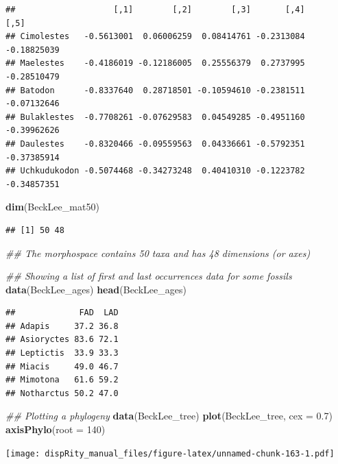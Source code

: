 \documentclass[]{book}
\newenvironment{Shaded}{\begin{snugshade}}{\end{snugshade}}
\newcommand{\CommentTok}[1]{\textcolor[rgb]{0.56,0.35,0.01}{\textit{#1}}}
\newcommand{\DataTypeTok}[1]{\textcolor[rgb]{0.13,0.29,0.53}{#1}}
\newcommand{\DecValTok}[1]{\textcolor[rgb]{0.00,0.00,0.81}{#1}}
\newcommand{\FloatTok}[1]{\textcolor[rgb]{0.00,0.00,0.81}{#1}}
\newcommand{\KeywordTok}[1]{\textcolor[rgb]{0.13,0.29,0.53}{\textbf{#1}}}
\newcommand{\NormalTok}[1]{#1}
\begin{document}
\begin{verbatim}
##                    [,1]        [,2]        [,3]       [,4]        [,5]
## Cimolestes   -0.5613001  0.06006259  0.08414761 -0.2313084 -0.18825039
## Maelestes    -0.4186019 -0.12186005  0.25556379  0.2737995 -0.28510479
## Batodon      -0.8337640  0.28718501 -0.10594610 -0.2381511 -0.07132646
## Bulaklestes  -0.7708261 -0.07629583  0.04549285 -0.4951160 -0.39962626
## Daulestes    -0.8320466 -0.09559563  0.04336661 -0.5792351 -0.37385914
## Uchkudukodon -0.5074468 -0.34273248  0.40410310 -0.1223782 -0.34857351
\end{verbatim}

\begin{Shaded}
\begin{Highlighting}[]
\KeywordTok{dim}\NormalTok{(BeckLee_mat50)}
\end{Highlighting}
\end{Shaded}

\begin{verbatim}
## [1] 50 48
\end{verbatim}

\begin{Shaded}
\begin{Highlighting}[]
\CommentTok{## The morphospace contains 50 taxa and has 48 dimensions (or axes)}

\CommentTok{## Showing a list of first and last occurrences data for some fossils}
\KeywordTok{data}\NormalTok{(BeckLee_ages)}
\KeywordTok{head}\NormalTok{(BeckLee_ages)}
\end{Highlighting}
\end{Shaded}

\begin{verbatim}
##             FAD  LAD
## Adapis     37.2 36.8
## Asioryctes 83.6 72.1
## Leptictis  33.9 33.3
## Miacis     49.0 46.7
## Mimotona   61.6 59.2
## Notharctus 50.2 47.0
\end{verbatim}

\begin{Shaded}
\begin{Highlighting}[]
\CommentTok{## Plotting a phylogeny}
\KeywordTok{data}\NormalTok{(BeckLee_tree)}
\KeywordTok{plot}\NormalTok{(BeckLee_tree, }\DataTypeTok{cex =} \FloatTok{0.7}\NormalTok{)}
\KeywordTok{axisPhylo}\NormalTok{(}\DataTypeTok{root =} \DecValTok{140}\NormalTok{)}
\end{Highlighting}
\end{Shaded}

\texttt{[image: dispRity\_manual\_files/figure-latex/unnamed-chunk-163-1.pdf]}
\end{document}
